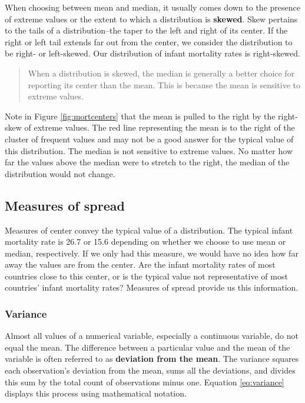\documentclass[
]{book}
\begin{document}
When choosing between mean and median, it usually comes down to the presence of extreme values or the extent to which a distribution is \textbf{skewed}. Skew pertains to the tails of a distribution--the taper to the left and right of its center. If the right or left tail extends far out from the center, we consider the distribution to be right- or left-skewed. Our distribution of infant mortality rates is right-skewed.

\begin{quote}
When a distribution is skewed, the median is generally a better choice for reporting its center than the mean. This is because the mean is sensitive to extreme values.
\end{quote}

Note in Figure \ref{fig:mortcenters} that the mean is pulled to the right by the right-skew of extreme values. The red line representing the mean is to the right of the cluster of frequent values and may not be a good answer for the typical value of this distribution. The median is not sensitive to extreme values. No matter how far the values above the median were to stretch to the right, the median of the distribution would not change.

\hypertarget{measures-of-spread}{%
\subsection{Measures of spread}\label{measures-of-spread}}

Measures of center convey the typical value of a distribution. The typical infant mortality rate is 26.7 or 15.6 depending on whether we choose to use mean or median, respectively. If we only had this measure, we would have no idea how far away the values are from the center. Are the infant mortality rates of most countries close to this center, or is the typical value not representative of most countries' infant mortality rates? Measures of spread provide us this information.

\hypertarget{variance}{%
\subsubsection*{Variance}\label{variance}}

Almost all values of a numerical variable, especially a continuous variable, do not equal the mean. The difference between a particular value and the mean of the variable is often referred to as \textbf{deviation from the mean}. The variance squares each observation's deviation from the mean, sums all the deviations, and divides this sum by the total count of observations minus one. Equation \eqref{eq:variance} displays this process using mathematical notation.
\end{document}
